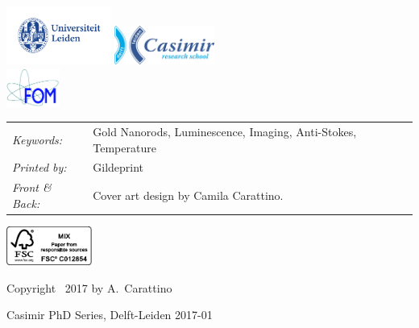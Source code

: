 \begin{titlepage}
\medskip

\vfill
\begin{center}
    \includegraphics[height=0.75in]{title/logos/leiden}
    \hspace{2em}
    \includegraphics[height=0.5in]{title/logos/casimir} \\
    \includegraphics[height=0.5in]{title/logos/fom}
\end{center}
\vfill

\noindent
\begin{tabular}{@{}p{}@{}p{}}
    \textit{Keywords:} & Gold Nanorods, Luminescence, Imaging,
    Anti-Stokes, Temperature
    \\[\medskipamount] \textit{Printed by:} & Gildeprint \\[\medskipamount]
    \textit{Front \& Back:} & Cover art design by Camila Carattino.
\end{tabular}

\vspace{2\bigskipamount}

\includegraphics[height=0.5in]{title/logos/fsc}

\vspace{1\bigskipamount}

\noindent Copyright \textcopyright\ 2017 by A.~Carattino

\noindent Casimir PhD Series, Delft-Leiden 2017-01


\end{titlepage}

